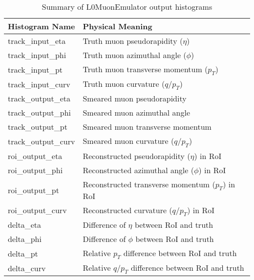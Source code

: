 \begin{table}[htbp]
  \centering
  \caption{Summary of L0MuonEmulator output histograms}
  \label{tab:L0MuonPlots}
  \begin{tabular}{ll}
    \hline
    Histogram Name & Physical Meaning \\
    \hline
    track\_input\_eta     & Truth muon pseudorapidity ($\eta$) \\
    track\_input\_phi     & Truth muon azimuthal angle ($\phi$) \\
    track\_input\_pt      & Truth muon transverse momentum ($p_T$) \\
    track\_input\_curv    & Truth muon curvature ($q/p_T$) \\
    track\_output\_eta    & Smeared muon pseudorapidity \\
    track\_output\_phi    & Smeared muon azimuthal angle \\
    track\_output\_pt     & Smeared muon transverse momentum \\
    track\_output\_curv   & Smeared muon curvature ($q/p_T$) \\
    roi\_output\_eta      & Reconstructed pseudorapidity ($\eta$) in RoI  \\
    roi\_output\_phi      & Reconstructed azimuthal angle ($\phi$) in RoI  \\
    roi\_output\_pt       & Reconstructed transverse momentum ($p_T$) in RoI \\
    roi\_output\_curv     & Reconstructed curvature ($q/p_T$) in RoI\\
    delta\_eta            & Difference of $\eta$ between RoI and truth \\
    delta\_phi            & Difference of $\phi$ between RoI and truth\\
    delta\_pt             & Relative $p_T$ difference between RoI and truth \\
    delta\_curv           & Relative $q/p_T$ difference between RoI and truth \\
    \hline
  \end{tabular}
\end{table}
